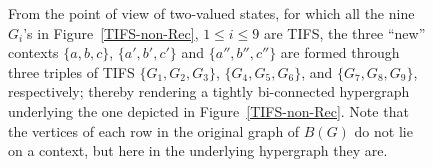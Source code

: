 \documentclass[%
12pt,
prereprint,
showpacs,
showkeys,
preprintnumbers,
amsmath,amssymb,
aps,
pra,
longbibliography,
notitlepage
]{revtex4-1}
\theoremstyle{definition}
\begin{document}
\begin{figure}
\begin{center}
                \end{center}
                \caption{\label{Fig:underlying}
                        From the point of view of two-valued states, for which all the nine $G_i$'s in Figure~\ref{TIFS-non-Rec}, $1\le i\le 9$  are TIFS, the three ``new'' contexts
                        $\{a, b, c\}$, $\{a', b', c'\}$ and $\{a'', b'',c''\}$ are formed
                        through three triples of TIFS
                        $\{G_1,G_2,G_3\}$, $\{G_4,G_5,G_6\}$, and $\{G_7,G_8,G_9\}$, respectively; thereby rendering a tightly bi-connected hypergraph underlying the one depicted in Figure~\ref{TIFS-non-Rec}. Note that the vertices of each row in the original graph of $B(G)$ do not lie on a context, but here in the underlying hypergraph they are.
                }
        \end{figure}
\end{document}
